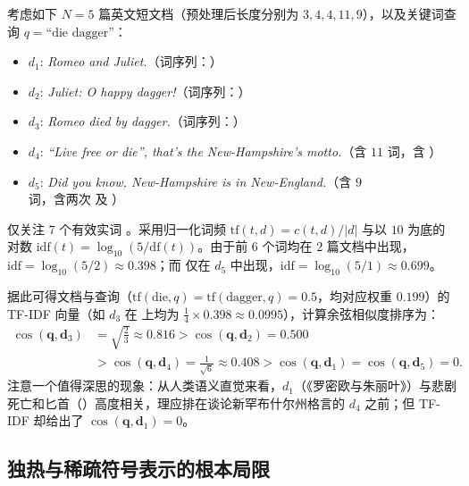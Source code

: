 \begin{example}[title={TF-IDF 检索排序与词汇鸿沟现象}]\label{eg:romeo-tfidf}
考虑如下 $N=5$ 篇英文短文档（预处理后长度分别为 $3, 4, 4, 11, 9$），以及关键词查询 $q=\text{``die dagger''}$：
\begin{itemize}
  \item $d_1$: \emph{Romeo and Juliet.}（词序列：）
  \item $d_2$: \emph{Juliet: O happy dagger!}（词序列：）
  \item $d_3$: \emph{Romeo died by dagger.}（词序列：）
  \item $d_4$: \emph{``Live free or die'', that's the New-Hampshire's motto.}（含 $11$ 词，含 ）
  \item $d_5$: \emph{Did you know, New-Hampshire is in New-England.}（含 $9$ 词，含两次  及 ）
\end{itemize}
仅关注 $7$ 个有效实词 。采用归一化词频 $\mathrm{tf}(t,d)=c(t,d)/|d|$ 与以 $10$ 为底的对数 $\mathrm{idf}(t)=\log_{10}(5/\mathrm{df}(t))$。由于前 $6$ 个词均在 $2$ 篇文档中出现，$\mathrm{idf}=\log_{10}(5/2)\approx 0.398$；而  仅在 $d_5$ 中出现，$\mathrm{idf}=\log_{10}(5/1)\approx 0.699$。

据此可得文档与查询（$\mathrm{tf}(\text{die},q)=\mathrm{tf}(\text{dagger},q)=0.5$，均对应权重 $0.199$）的 TF-IDF 向量（如 $d_3$ 在  上均为 $\frac{1}{4}\times 0.398\approx 0.0995$），计算余弦相似度排序为：
\begin{align*}
\cos(\mathbf{q},\mathbf{d}_3) &= \sqrt{\tfrac{2}{3}} \approx 0.816
> \cos(\mathbf{q},\mathbf{d}_2) = 0.500 \\
&> \cos(\mathbf{q},\mathbf{d}_4) = \tfrac{1}{\sqrt{6}} \approx 0.408
> \cos(\mathbf{q},\mathbf{d}_1) = \cos(\mathbf{q},\mathbf{d}_5) = 0.
\end{align*}
注意一个值得深思的现象：从人类语义直觉来看，$d_1$（《罗密欧与朱丽叶》）与悲剧死亡和匕首（）高度相关，理应排在谈论新罕布什尔州格言的 $d_4$ 之前；但 TF-IDF 却给出了 $\cos(\mathbf{q},\mathbf{d}_1)=0$。
\end{example}

\subsection{独热与稀疏符号表示的根本局限}


